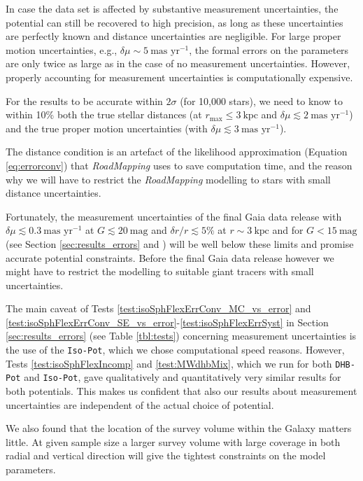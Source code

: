 \documentclass[iop,revtex4,numberedappendix,appendixfloats]{emulateapj}
\newcommand{\RM}{{\sl RoadMapping}}
\begin{document}
In case the data set is affected by substantive measurement uncertainties, the potential can still be recovered to high precision, as long as these uncertainties are perfectly known and distance uncertainties are negligible. For large proper motion uncertainties, e.g., $\delta \mu \sim 5~\text{mas yr}^{-1}$, the formal errors on the parameters are only twice as large as in the case of no measurement uncertainties. However, properly accounting for measurement uncertainties is computationally expensive.

For the results to be accurate within $2\sigma$ (for 10,000 stars), we need to know to within 10\% both the true stellar distances (at $r_\text{max} \leq 3~\text{kpc}$ and $\delta \mu \lesssim 2 ~ \text{mas yr}^{-1}$) and the true proper motion uncertainties (with $\delta \mu \lesssim 3 ~ \text{mas yr}^{-1}$).

The distance condition is an artefact of the likelihood approximation (Equation \eqref{eq:errorconv}) that \RM{} uses to save computation time, and the reason why we will have to restrict the \RM{} modelling to stars with small distance uncertainties.

Fortunately, the measurement uncertainties of the final Gaia data release with $\delta\mu\lesssim0.3~\text{mas yr}^{-1}$ at $G\lesssim20~\text{mag}$ and $\delta r/r\lesssim5\%$ at $r\sim3~\text{kpc}$ and for $G<15~\text{mag}$ (see Section \ref{sec:results_errors} and \citealt{2014EAS....67...23D}) will be well below these limits and promise accurate potential constraints. Before the final Gaia data release however we might have to restrict the modelling to suitable giant tracers with small uncertainties.

The main caveat of Tests \ref{test:isoSphFlexErrConv_MC_vs_error} and \ref{test:isoSphFlexErrConv_SE_vs_error}-\ref{test:isoSphFlexErrSyst} in Section \ref{sec:results_errors} (see Table \ref{tbl:tests}) concerning measurement uncertainties is the use of the \texttt{Iso-Pot}, which we chose computational speed reasons. However, Tests \ref{test:isoSphFlexIncomp} and \ref{test:MWdhbMix}, which we run for both \texttt{DHB-Pot} and \texttt{Iso-Pot}, gave qualitatively and quantitatively very similar results for both potentials. This makes us confident that also our results about measurement uncertainties are independent of the actual choice of potential.

We also found that the location of the survey volume within the Galaxy matters little. At given sample size a larger survey volume with large coverage in both radial and vertical direction will give the tightest constraints on the model parameters.
\end{document}
